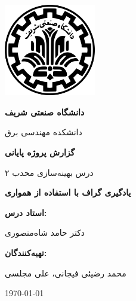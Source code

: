 \documentclass[10pt,twocolumn,a4paper]{article}
\begin{document}
	\begin{titlepage}
		\begin{center}
			
			\includegraphics[width=4cm]{assets/logo-sharif.png} %
			
			\vspace{1cm}
			
			{\huge \textbf{دانشگاه صنعتی شریف}}  
			
			\vspace{0.5cm}
			
			{\Large دانشکده مهندسی برق}
			
			\vspace{1.5cm}
			
			{\Huge \textbf{گزارش پروژه پایانی}} 
			
			\vspace{0.5cm}
			
			{\Large درس بهینه‌سازی محدب ۲}
			
			\vspace{1.5cm}
			
			{\Huge \textbf{یادگیری گراف با استفاده از همواری}}
			
			\vspace{1.5cm}
			
			\textbf{\Large استاد درس:}  
			
			\vspace{0.5cm}
			
			{\Large دکتر حامد شاه‌منصوری}
			
			\vspace{1.5cm}
			
			\textbf{\Large تهیه‌کنندگان:}  
			
			\vspace{0.5cm}
			
			{\Large محمد رضیئی فیجانی، علی مجلسی}
			
			\vfill
			
			{\Large \today}
			
		\end{center}
	\end{titlepage}
	
\end{document}
